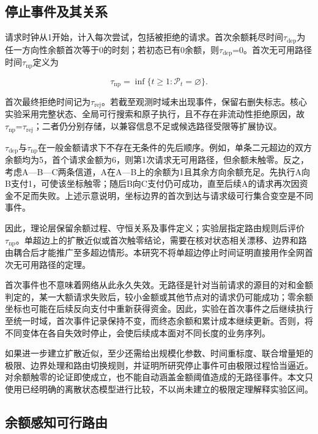 \documentclass[UTF8,a4paper,twocolumn,fontset=none,zihao=5]{ctexart}
\begin{document}
\subsection{停止事件及其关系}

请求时钟从1开始，计入每次尝试，包括被拒绝的请求。首次余额耗尽时间$\tau_{\mathrm{dep}}$为任一方向性余额首次等于0的时刻；若初态已有0余额，则$\tau_{\mathrm{dep}}$=0。首次无可用路径时间$\tau_{\mathrm{np}}$定义为



\begin{equation}
\tau_{\mathrm{np}}=\inf\{t\geq1:\mathcal P_t=\varnothing\}.
\label{eq:5}\end{equation}


首次最终拒绝时间记为$\tau_{\mathrm{rej}}$。若截至观测时域未出现事件，保留右删失标志。核心实验采用完整状态、全局可行搜索和原子执行，且不存在非流动性拒绝原因，故$\tau_{\mathrm{np}}$=$\tau_{\mathrm{rej}}$；二者仍分别存储，以兼容信息不足或候选路径受限等扩展协议。


$\tau_{\mathrm{dep}}$与$\tau_{\mathrm{np}}$在一般金额请求下不存在无条件的先后顺序。例如，单条二元超边的双方余额均为5，首个请求金额为6，则第1次请求无可用路径，但余额未触零。反之，考虑A—B—C两条信道，A在A—B上的余额为1且其余方向余额充足。先执行A向B支付1，可使该坐标触零；随后B向C支付仍可成功，直至后续A的请求再次因资金不足而失败。上述示意说明，坐标边界的首次到达与请求级可行集合变空是不同事件。


因此，理论层保留余额过程、守恒关系及事件定义；实验层指定路由规则后评价$\tau_{\mathrm{np}}$。单超边上的扩散近似或首次触零结论，需要在核对状态相关漂移、边界和路由耦合后才能推广至多超边情形。本研究不将单超边停止时间证明直接用作全网首次无可用路径的定理。


首次事件也不意味着网络从此永久失效。无路径是针对当前请求的源目的对和金额判定的，某一大额请求失败后，较小金额或其他节点对的请求仍可能成功；零余额坐标也可能在后续反向支付中重新获得资金。因此，实验在首次事件之后继续执行至统一时域，首次事件记录保持不变，而终态余额和累计成本继续更新。否则，将不同变体在各自失效时停止，会使后续成本面对不同长度的业务序列。


如果进一步建立扩散近似，至少还需给出规模化参数、时间重标度、联合增量矩的极限、边界处理和路由切换规则，并证明所研究停止事件可由极限过程恰当逼近。对余额触零的论证即使成立，也不能自动涵盖金额阈值造成的无路径事件。本文只使用已经明确的离散状态模型进行比较，不以尚未建立的极限定理解释实验区间。


\subsection{余额感知可行路由}
\end{document}
